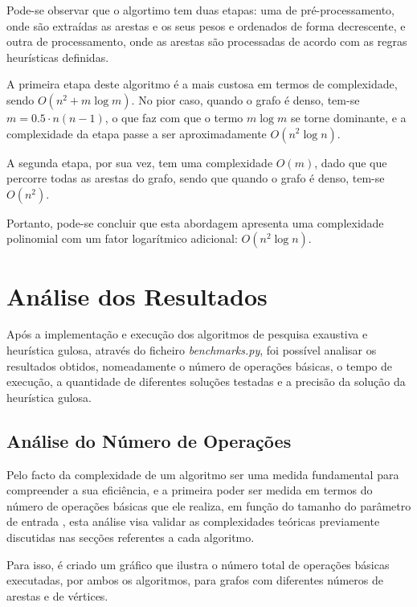 \documentclass[mirror]{revdetua}
\begin{document}

Pode-se observar que o algortimo tem duas etapas: uma de pré-processamento, onde são extraídas as arestas e os seus pesos e ordenados de forma decrescente, e outra de processamento, onde as arestas são processadas de acordo com as regras heurísticas definidas.

A primeira etapa deste algoritmo é a mais custosa em termos de complexidade, sendo $O(n^2 + m \log m)$. No pior caso, quando o grafo é denso, tem-se $m = 0.5 \cdot n(n-1)$, o que faz com que o termo $m \log m$ se torne dominante, e a complexidade da etapa passe a ser aproximadamente $O(n^2 \log n)$.

A segunda etapa, por sua vez, tem uma complexidade $O(m)$, dado que que percorre todas as arestas do grafo, sendo que quando o grafo é denso, tem-se $O(n^2)$.

Portanto, pode-se concluir que esta abordagem apresenta uma complexidade polinomial com um fator logarítmico adicional: $O(n^2 \log n)$.

\section{Análise dos Resultados}

Após a implementação e execução dos algoritmos de pesquisa exaustiva e heurística gulosa, através do ficheiro \textit{benchmarks.py}, foi possível analisar os resultados obtidos, nomeadamente o número de operações básicas, o tempo de execução, a quantidade de diferentes soluções testadas e a precisão da solução da heurística gulosa.

\subsection{Análise do Número de Operações}

Pelo facto da complexidade de um algoritmo ser uma medida fundamental para compreender a sua eficiência, e a primeira poder ser medida em termos do número de operações básicas que ele realiza, em função do tamanho do parâmetro de entrada \cite{BS22}, esta análise visa validar as complexidades teóricas previamente discutidas nas secções referentes a cada algoritmo.

Para isso, é criado um gráfico que ilustra o número total de operações básicas executadas, por ambos os algoritmos, para grafos com diferentes números de arestas e de vértices.
\end{document}
